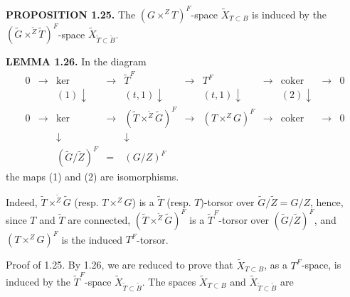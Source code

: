 \documentclass[9pt,twoside]{extarticle}
\begin{document}
{\noindent\textbf{PROPOSITION 1.25.} The \((G\times^Z T)^F\)-space \(\widetilde X_{T\subset B}\) is induced by the \((\widetilde G\times^{\widetilde Z}\widetilde T)^F\)-space \(\widetilde X_{\widetilde T\subset\widetilde B}\).\par

\noindent\textbf{LEMMA 1.26.} In the diagram \[
\begin{array}{ccccccccccc}
0&\longrightarrow&\ker&\longrightarrow&\widetilde T^F&\longrightarrow&T^F&\longrightarrow&\operatorname{coker}&\longrightarrow&0\\
&&{\scriptstyle(1)}\downarrow&&{\scriptstyle(t,1)}\downarrow&&{\scriptstyle(t,1)}\downarrow&&{\scriptstyle(2)}\downarrow&&\\
0&\longrightarrow&\ker&\longrightarrow&(\widetilde T\times^{\widetilde Z}\widetilde G)^F&\longrightarrow&(T\times^Z G)^F&\longrightarrow&\operatorname{coker}&\longrightarrow&0\\
&&\downarrow&&\downarrow&&&&&&\\
&&(\widetilde G/\widetilde Z)^F&=&(G/Z)^F&&&&&&
\end{array}
\] the maps (1) and (2) are isomorphisms.\par

Indeed, \(\widetilde T\times^{\widetilde Z}\widetilde G\) (resp. \(T\times^Z G\)) is a \(\widetilde T\) (resp. \(T\))-torsor over \(\widetilde G/\widetilde Z=G/Z\), hence, since \(T\) and \(\widetilde T\) are connected, \((\widetilde T\times^{\widetilde Z}\widetilde G)^F\) is a \(\widetilde T^F\)-torsor over \((\widetilde G/\widetilde Z)^F\), and \((T\times^Z G)^F\) is the induced \(T^F\)-torsor.\par

Proof of 1.25. By 1.26, we are reduced to prove that \(\widetilde X_{T\subset B}\), as a \(T^F\)-space, is induced by the \(\widetilde T^F\)-space \(\widetilde X_{\widetilde T\subset\widetilde B}\). The spaces \(\widetilde X_{T\subset B}\) and \(\widetilde X_{\widetilde T\subset\widetilde B}\) are\par
}
\end{document}
